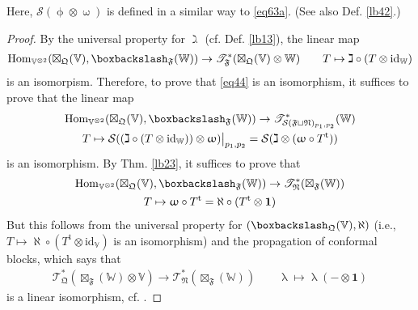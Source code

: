 \documentclass[11pt,b5paper,notitlepage]{article}
\theoremstyle{definition}
\theoremstyle{plain}
\newcommand{\tr}{\mathrm{t}} %
\newcommand{\idt}{\mathbf{1}}
\newcommand{\Hom}{\mathrm{Hom}}
\newcommand{\Vbb}{\mathbb V}
\newcommand{\Wbb}{\mathbb W}
\newcommand{\<}{\left\langle}
\renewcommand{\>}{\right\rangle}
\newcommand{\ST}{\mathscr{T}}
\newcommand{\MS}{\mathcal{S}}
\newcommand{\bbs}{\boxbackslash}
\newcommand{\fq}{{\mathfrak Q}}
\newcommand{\id}{\mathrm{id}}
\newcommand{\fn}{\mathfrak{N}}
\newcommand{\ff}{\mathfrak{F}}
\numberwithin{equation}{section}
\begin{document}
Here, $\MS(\upphi\otimes\upomega)$ is defined in a similar way to \eqref{eq63a}. (See also Def. \ref{lb42}.)

\begin{proof}
By the universal property for $\gimel$ (cf. Def. \ref{lb13}), the linear map
\begin{align*}
\Hom_{\Vbb^{\otimes 2}}(\boxtimes_\fq(\Vbb),\bbs_\ff(\Wbb))\rightarrow \ST^*_{\ff}(\boxtimes_\fq(\Vbb)\otimes\Wbb)\qquad T\mapsto \gimel\circ(T\otimes\id_{\Wbb})
\end{align*}
is an isomorpism. Therefore, to prove that \eqref{eq44} is an isomorphism, it suffices to prove that the linear map
\begin{gather*}
\Hom_{\Vbb^{\otimes 2}}(\boxtimes_\fq(\Vbb),\bbs_\ff(\Wbb))\rightarrow \ST^*_{\MS(\ff\sqcup\fn)_{p_1,p_2}}(\Wbb)\\
T\mapsto \MS((\gimel\circ (T\otimes\id_\Wbb))\otimes\upomega)\big|_{p_1,p_2}=\MS(\gimel\otimes (\upomega\circ T^\tr))
\end{gather*}
is an isomorphism. By Thm. \ref{lb23}, it suffices to prove that
\begin{gather*}
\Hom_{\Vbb^{\otimes 2}}(\boxtimes_\fq(\Vbb),\bbs_\ff(\Wbb))\rightarrow \ST^*_\fn(\boxtimes_\ff(\Wbb))\\
T\mapsto \upomega\circ T^\tr=\aleph \circ (T^\tr\otimes\idt)
\end{gather*}
But this follows from the universal property for $(\bbs_\fq(\Vbb),\aleph)$ (i.e., $T\mapsto \aleph\circ(T^\tr\otimes\id_\Vbb)$ is an isomorphism) and the propagation of conformal blocks, which says that
\begin{gather*}
\ST^*_\fq(\boxtimes_\ff(\Wbb)\otimes\Vbb)\rightarrow\ST^*_\fn(\boxtimes_\ff(\Wbb))\qquad \uplambda\mapsto \uplambda (-\otimes\idt)
\end{gather*}
is a linear isomorphism, cf. \cite[Cor. 2.44]{GZ1}.
\end{proof}
\end{document}
